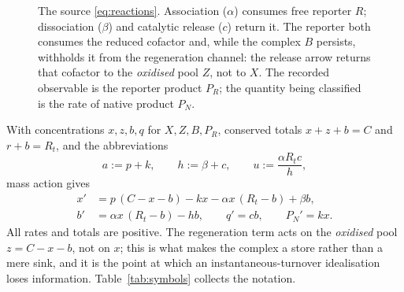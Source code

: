 \documentclass[11pt]{article}
\theoremstyle{definition}
\theoremstyle{remark}
\begin{document}
\begin{figure}[ht]
\centering
{}
\caption{The source \eqref{eq:reactions}. Association ($\alpha$) consumes free
reporter $R$; dissociation ($\beta$) and catalytic release ($c$) return it. The
reporter both consumes the reduced cofactor and, while the complex $B$
persists, withholds it from the regeneration channel: the release arrow returns
that cofactor to the \emph{oxidised} pool $Z$, not to $X$. The recorded
observable is the reporter product $P_R$; the quantity being classified is the
rate of native product $P_N$.}
\label{fig:scheme}
\end{figure}

With concentrations $x,z,b,q$ for $X,Z,B,P_R$, conserved totals
$x+z+b=C$ and $r+b=R_t$, and the abbreviations
\[
a:=p+k,\qquad h:=\beta+c,\qquad u:=\frac{\alpha R_t c}{h},
\]
mass action gives
\begin{equation}
\begin{aligned}
x'&=p\,(C-x-b)-kx-\alpha x\,(R_t-b)+\beta b,\\
b'&=\alpha x\,(R_t-b)-hb,\qquad
q'=cb,\qquad P_N'=kx .
\end{aligned}
\label{eq:source}
\end{equation}
All rates and totals are positive. The regeneration term acts on the
\emph{oxidised} pool $z=C-x-b$, not on $x$; this is what makes the complex a
store rather than a mere sink, and it is the point at which an
instantaneous-turnover idealisation loses information. Table~\ref{tab:symbols}
collects the notation.
\end{document}
